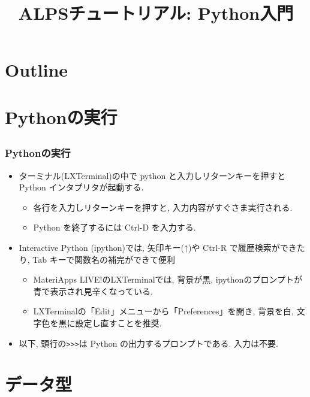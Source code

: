
\title{ALPSチュートリアル: Python入門}



\begin{frame}
  \titlepage
\end{frame}

\section*{Outline}
\begin{frame}
  \tableofcontents
\end{frame}

\section{Pythonの実行}

\subsection*{\redm\whiteb\greenb}
\begin{frame}[t, fragile]
\frametitle{Pythonの実行}
\begin{itemize}
\item ターミナル(LXTerminal)の中で python と入力しリターンキーを押すと Python インタプリタが起動する.
  \begin{itemize}
  \item 各行を入力しリターンキーを押すと, 入力内容がすぐさま実行される.
  \item Python を終了するには Ctrl-D を入力する.
  \end{itemize}
\item Interactive Python (ipython)では, 矢印キー(↑)や Ctrl-R で履歴検索ができたり, Tab キーで関数名の補完ができて便利
  \begin{itemize}
  \item MateriApps LIVE!のLXTerminalでは, 背景が黒, ipythonのプロンプトが青で表示され見辛くなっている.
  \item LXTerminalの「Edit」メニューから「Preferences」を開き, 背景を白, 文字色を黒に設定し直すことを推奨.
  \end{itemize}
\item 以下, 頭行の\verb+>>>+は Python の出力するプロンプトである. 入力は不要.
\end{itemize}
\end{frame}

\section{データ型}

